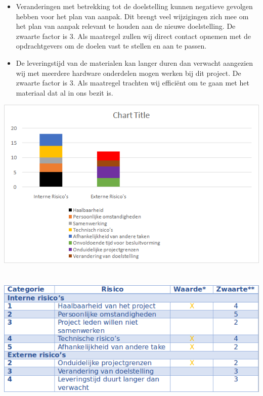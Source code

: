 \documentclass[oneside]{book}
\begin{document}
{\begin{itemize}
	\item Veranderingen met betrekking tot de doelstelling kunnen negatieve gevolgen hebben voor  
    het plan van aanpak. Dit brengt veel wijzigingen zich mee om het plan van aanpak relevant te   
    houden aan de nieuwe doelstelling. De zwaarte factor is 3. Als maatregel zullen wij direct  
    contact  opnemen met de opdrachtgevers om de doelen vast te stellen en aan te passen.

	\item De leveringstijd van de materialen kan langer duren dan verwacht aangezien wij met 
    meerdere hardware onderdelen mogen werken bij dit project.  De zwaarte factor is 3. Als
    maatregel trachten wij efficiënt om te gaan met het materiaal dat al in ons bezit is.    
\end{itemize}
} 
\clearpage
\includegraphics[scale=0.80]{image/graph.png}
\\
\\
\\
\includegraphics[scale=0.75]{image/table.png}
\end{document}
